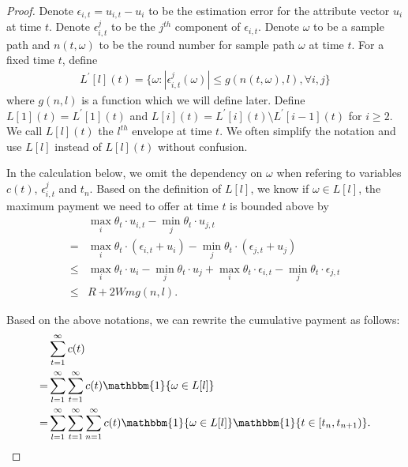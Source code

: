 \documentclass{article}
\begin{document}
\begin{proof}
Denote $\epsilon_{i,t}=u_{i,t}-u_{i}$ to be the estimation error for the attribute vector $u_i$ at time $t$. Denote $\epsilon_{i,t}^{j}$ to be the $j^{th}$ component of $\epsilon_{i,t}$. Denote $\omega$ to be a sample path and $n(t,\omega)$ to be the round number for sample path $\omega$ at time $t$. For a fixed time $t$, define
\begin{align}
L^{'}[l](t) = \{\omega:|\epsilon_{i,t}^{j}(\omega)|\leq g(n(t,\omega),l), \forall i,j\}\nonumber
\end{align}
where $g(n,l)$ is a function which we will define later. Define $L[1](t) = L^{'}[1](t)$ and $L[i](t) = L^{'}[i](t)\setminus L^{'}[i-1](t)$ for $i\geq 2$. We call $L[l](t)$ the $l^{th}$ envelope at time $t$. We often simplify the notation and use $L[l]$ instead of $L[l](t)$ without confusion.

In the calculation below, we omit the dependency on $\omega$ when refering to variables $c(t)$, $\epsilon_{i,t}^{j}$ and $t_n$. Based on the definition of $L[l]$, we know if $\omega\in L[l]$, the maximum payment we need to offer at time $t$ is bounded above by 
\begin{align}
&\max_{i}\theta_t\cdot u_{i,t} - \min_{j}\theta_t\cdot u_{j,t} \nonumber \\
= &\max_{i}\theta_t\cdot (\epsilon_{i,t}+u_i) - \min_{j}\theta_t\cdot (\epsilon_{j,t}+u_j) \nonumber \\
\leq &\max_{i}\theta_t\cdot u_i - \min_{j}\theta_t\cdot u_j +\max_{i}\theta_t\cdot \epsilon_{i,t} - \min_{j}\theta_t\cdot \epsilon_{j,t}\nonumber \\
\leq & R + 2Wmg(n,l). \nonumber
\end{align}

Based on the above notations, we can rewrite the cumulative payment as follows:
\begin{align}
&\sum_{t=1}^{\infty}c(t) \nonumber \\
=&\sum_{l=1}^{\infty}\sum_{t=1}^{\infty}c(t)\mathbbm{1}\{\omega\in L[l]\} \nonumber \\
=&\sum_{l=1}^{\infty}\sum_{t=1}^{\infty}\sum_{n=1}^{\infty}c(t)\mathbbm{1}\{\omega\in L[l]\}\mathbbm{1}\{t\in [t_n,t_{n+1})\}. \nonumber
\end{align}


\end{proof}
\end{document}
